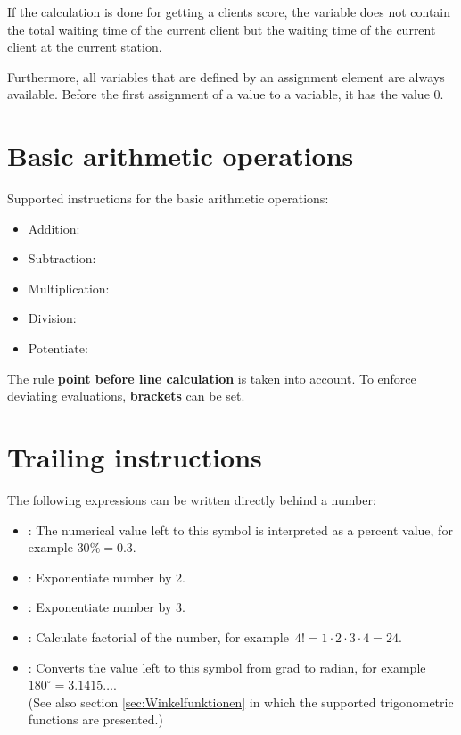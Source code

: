 If the calculation is done for getting a clients score, the variable  does not contain
the total waiting time of the current client but the waiting time of the current client at the
current station.

Furthermore, all variables that are defined by an assignment element are always available.
Before the first assignment of a value to a variable, it has the value 0.



\chapter{Basic arithmetic operations}

Supported instructions for the basic arithmetic operations:
\begin{itemize}
\item Addition: \cmd{$+$}
\item Subtraction: \cmd{$-$}
\item Multiplication: \cmd{$*$}
\item Division: \cmd{$/$}
\item Potentiate: \cmd{$\hat~$}
\end{itemize}

The rule \textbf{point before line calculation} is taken into account.
To enforce deviating evaluations, \textbf{brackets} can be set.



\chapter{Trailing instructions}

The following expressions can be written directly behind a number:

\begin{itemize}
\item
\cmd{\%}:
The numerical value left to this symbol is interpreted as a percent value,
for example $30\%=0.3$.

\item
{}:
Exponentiate number by 2.

\item
{}:
Exponentiate number by 3.

\item
\cmd{!}:
Calculate factorial of the number, for example\ $4!=1\cdot2\cdot3\cdot4=24$.

\item
\cmd{$^{\circ}$}:
Converts the value left to this symbol from grad to radian, for example $180^{\circ}=3.1415\ldots$.\\
(See also section \ref{sec:Winkelfunktionen} in which the supported
trigonometric functions are presented.)
\end{itemize}



